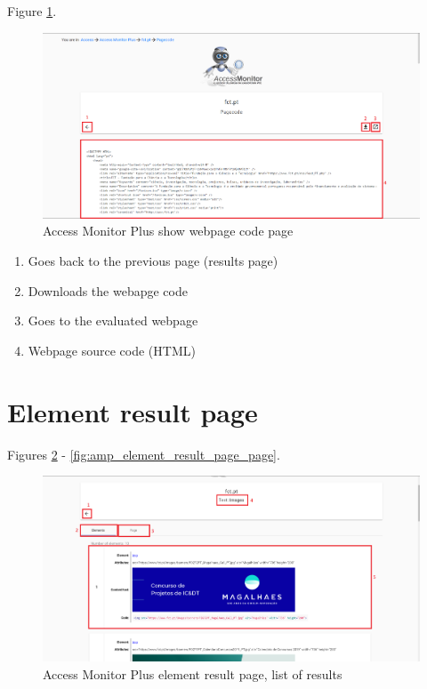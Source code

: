 Figure \ref{fig:amp_webpage_page}.

\begin{figure}[H]
    \centering
    \includegraphics[width=\linewidth]{lib/images/amp/show_webpage_code_page.png}
    \caption{Access Monitor Plus show webpage code page}
    \label{fig:amp_webpage_page}
\end{figure}

\begin{enumerate}
    \item Goes back to the previous page (results page)
    \item Downloads the webapge code
    \item Goes to the evaluated webpage 
    \item Webpage source code (HTML)
\end{enumerate}

\clearpage

\section{Element result page}
\label{sec:amp_element_result_page}

Figures \ref{fig:amp_element_result_page_list} - \ref{fig:amp_element_result_page_page}.

\begin{figure}[H]
    \centering
    \includegraphics[width=\linewidth]{lib/images/amp/element_result_page_list.png}
    \caption{Access Monitor Plus element result page, list of results}
    \label{fig:amp_element_result_page_list}
\end{figure}

